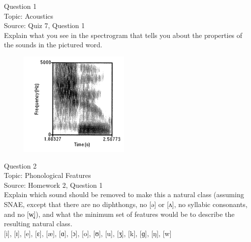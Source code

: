 \documentclass[12pt]{article}
\begin{document}
\begin{center}
\textbf{{\color{blue}{\HUGE START OF EXAM\\}}}

\textbf{{\color{blue}{\HUGE Student ID: 67125\\}}}

\textbf{{\color{blue}{\HUGE 4:30\\}}}

\end{center}
\newpage

{\large Question 1}\\

Topic: Acoustics\\
Source: Quiz 7, Question 1\\

Explain what you see in the spectrogram that tells you about the properties of the sounds in the pictured word.\\

\begin{figure}[H]
\includegraphics{../images/spectrogram_shoe.png}
\end{figure}

\newpage

{\large Question 2}\\

Topic: Phonological Features\\
Source: Homework 2, Question 1\\

Explain which sound should be removed to make this a natural class (assuming SNAE, except that there are no diphthongs, no [ə] or [ʌ], no syllabic consonants, and no [w̥]), and what the minimum set of features would be to describe the resulting natural class.\\

{[i]}, {[ɪ]}, {[e]}, {[ɛ]}, {[æ]}, {[ɑ]}, {[ɔ]}, {[o]}, {[ʊ]}, {[u]}, {[ʒ]}, {[k]}, {[ɡ]}, {[ŋ]}, {[w]}


\newpage

\begin{center}
\textbf{{\color{red}{\HUGE END OF EXAM}}}\\

\end{center}
\newpage
\end{document}
